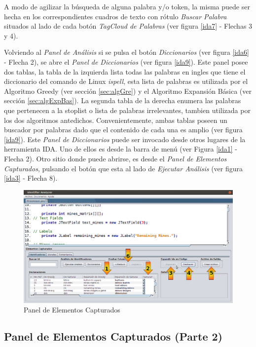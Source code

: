 A modo de agilizar la búsqueda de alguna palabra y/o token, la misma puede ser hecha en los correspondientes cuadros de texto con rótulo \textit{Buscar Palabra} situados al lado de cada botón \textit{TagCloud de Palabras} (ver figura \ref{ida7} - Flechas 3 y 4).

Volviendo al \textit{Panel de Análisis} si se pulsa el botón \textit{Diccionarios} (ver figura \ref{ida6} - Flecha 2), se abre el \textit{Panel de Diccionarios} (ver figura \ref{ida9}). Este panel posee dos tablas, la tabla de la izquierda lista todas las palabras en ingles que tiene el diccionario del comando de Linux \textit{ispell}, esta lista de palabras es utilizada por el Algoritmo Greedy (ver sección \ref{sec:algGre}) y el Algoritmo Expansión Básica (ver sección \ref{sec:algExpBas}). La segunda tabla de la derecha enumera las palabras que pertenecen a la stoplist o lista de palabras irrelevantes, tambien utilizada por los dos algoritmos antedichos. Convenientemente, ambas tablas poseen un buscador por palabras dado que el contenido de cada una es amplio (ver figura \ref{ida9}). Este \textit{Panel de Diccionarios} puede ser invocado desde otros lugares de la herramienta IDA. Uno de ellos es desde la barra de menú (ver Figura \ref{ida1} - Flecha 2). Otro sitio donde puede abrirse, es desde el \textit{Panel de Elementos Capturados}, pulsando el botón que esta al lado de \textit{Ejecutar Análisis} (ver figura \ref{ida3} - Flecha 8).

\begin{figure}[t] %
\centerline{%
\includegraphics[scale= 0.42]{./cap4/ida_10.png}
}
\caption{Panel de Elementos Capturados}
\label{ida10}
\end{figure}


\subsection{Panel de Elementos Capturados (Parte 2)}

